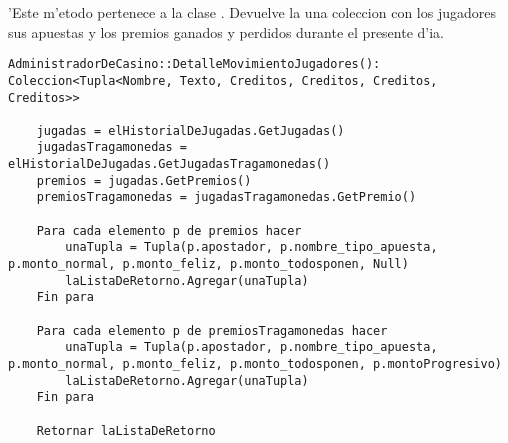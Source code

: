 
'Este m'etodo pertenece a la clase . Devuelve la una coleccion con los jugadores sus apuestas y los premios ganados y perdidos durante el presente d'ia.

\begin{verbatim}
AdministradorDeCasino::DetalleMovimientoJugadores(): Coleccion<Tupla<Nombre, Texto, Creditos, Creditos, Creditos, Creditos>>

	jugadas = elHistorialDeJugadas.GetJugadas()
	jugadasTragamonedas = elHistorialDeJugadas.GetJugadasTragamonedas()
	premios = jugadas.GetPremios()
	premiosTragamonedas = jugadasTragamonedas.GetPremio()

	Para cada elemento p de premios hacer
		unaTupla = Tupla(p.apostador, p.nombre_tipo_apuesta, p.monto_normal, p.monto_feliz, p.monto_todosponen, Null)
		laListaDeRetorno.Agregar(unaTupla)
	Fin para

	Para cada elemento p de premiosTragamonedas hacer
		unaTupla = Tupla(p.apostador, p.nombre_tipo_apuesta, p.monto_normal, p.monto_feliz, p.monto_todosponen, p.montoProgresivo)
		laListaDeRetorno.Agregar(unaTupla)
	Fin para

	Retornar laListaDeRetorno
\end{verbatim}
